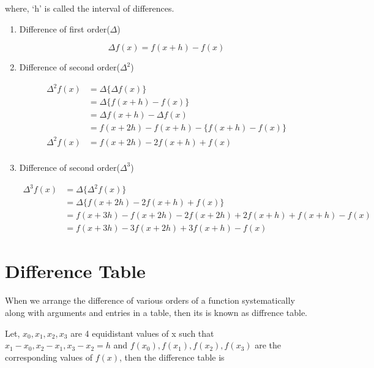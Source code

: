 \documentclass[11pt, a4paper, oneside]{book}
\begin{document}
         where, `h' is called the interval of differences.

         \begin{enumerate}
           \item Difference of first order($\Delta$)

             \begin{equation*}
               \Delta f(x)=f(x+h)-f(x)
             \end{equation*}

           \item Difference of second order($\Delta^2$)

             \begin{align*}
               \Delta^2 f(x)&=\Delta \{\Delta f(x)\}\\
               &=\Delta \{f(x+h)-f(x)\}\\
               &=\Delta f(x+h)-\Delta f(x)\\
               &=f(x+2h)-f(x+h)-\{f(x+h)-f(x)\}\\
               \Delta^2f(x)&=f(x+2h)-2f(x+h)+f(x)\\
             \end{align*}

           \item Difference of second order($\Delta^3$)

             \begin{align*}
               \Delta^3 f(x)&=\Delta \{\Delta^2 f(x)\}\\
               &=\Delta \{f(x+2h)-2f(x+h)+f(x)\}\\
               &=f(x+3h)-f(x+2h)-2f(x+2h)+2f(x+h)+f(x+h)-f(x)\\
               &=f(x+3h)-3f(x+2h)+3f(x+h)-f(x)
             \end{align*}

         \end{enumerate}


       \section{Difference Table}
         When we arrange the difference of various orders of a function systematically
         along with arguments and entries in a table, then its is known as diffrence table.

         Let, $x_0,x_1,x_2,x_3$ are 4 equidistant values of x such that $x_1-x_0,x_2-x_1,x_3-x_2=h$
         and $f(x_0),f(x_1),f(x_2),f(x_3)$ are the corresponding values of $f(x)$,
         then the difference table is
\end{document}

